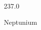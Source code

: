 \documentclass[12pt]{article}
\begin{document}
\hfill{}
\vfill
\begin{center}
  {\fontsize{50}{60}
  }

  237.0

Neptunium
\end{center}
\vfill
\end{document}
